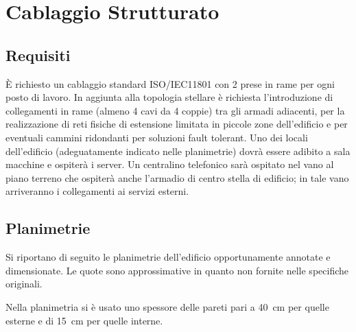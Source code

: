 %

\chapter{Cablaggio Strutturato}

\section{Requisiti}
È richiesto un cablaggio standard ISO/IEC11801 con 2 prese in rame per ogni posto di lavoro.
In aggiunta alla topologia stellare è richiesta l’introduzione di collegamenti in rame (almeno 4 cavi da 4 coppie)
tra gli armadi adiacenti, per la realizzazione di reti fisiche di estensione limitata in piccole zone dell’edificio
e per eventuali cammini ridondanti per soluzioni fault tolerant.
Uno dei locali dell’edificio (adeguatamente indicato nelle planimetrie) dovrà essere adibito a sala macchine e
ospiterà i server.
Un centralino telefonico sarà ospitato nel vano al piano terreno che ospiterà anche l’armadio di centro stella di
edificio; in tale vano arriveranno i collegamenti ai servizi esterni.

\section{Planimetrie}
Si riportano di seguito le planimetrie dell'edificio opportunamente annotate e dimensionate.
Le quote sono approssimative in quanto non fornite nelle specifiche originali.

Nella planimetria si è usato uno spessore delle pareti pari a \SI{40}{\centi\metre} per quelle esterne e di \SI{15}{\centi\metre} per
quelle interne.